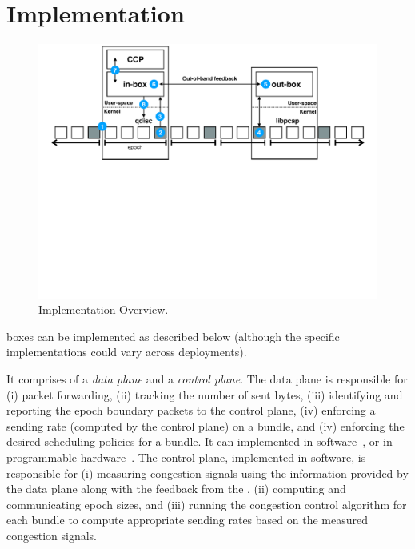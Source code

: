\section{Implementation}\label{s:impl}
\begin{figure}[t]
    \centering
    \includegraphics[width=2\columnwidth]{img/bundler-diagram}
    \caption{\name Implementation Overview.}\label{fig:bundler}
\end{figure}


\name boxes can be implemented as described below (although the specific implementations could vary across deployments).

\Para{\capinbox} It comprises of a \emph{data plane} and a \emph{control plane}. The data plane is responsible for (i) packet forwarding, (ii) tracking the number of sent bytes, (iii) identifying and reporting the epoch boundary packets to the control plane, (iv) enforcing a sending rate (computed by the control plane) on a bundle, and (iv) enforcing the desired scheduling policies for a bundle. It can implemented in software~\cite{bess, click, mos, netbricks, tc}, or in programmable hardware~\cite{p4}. The control plane, implemented in software, is responsible for (i) measuring congestion signals using the information provided by the data plane along with the feedback from the \outbox, (ii) computing and communicating epoch sizes, and (iii) running the congestion control algorithm for each bundle to compute appropriate sending rates based on the measured congestion signals. 

